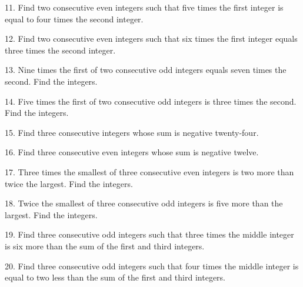 \documentclass{ximera}
\begin{document}
\begin{exercise}
11. Find two consecutive even integers such that five times the first integer is equal to four times the second integer.
\end{exercise}

\begin{exercise}
12. Find two consecutive even integers such that six times the first integer equals three times the second integer.
\end{exercise}

\begin{exercise}
13. Nine times the first of two consecutive odd integers equals seven times the second. Find the integers.
\end{exercise}

\begin{exercise}
14. Five times the first of two consecutive odd integers is three times the second. Find the integers.
\end{exercise}

\begin{exercise}
15. Find three consecutive integers whose sum is negative twenty-four.
\end{exercise}

\begin{exercise}
16. Find three consecutive even integers whose sum is negative twelve.
\end{exercise}

\begin{exercise}
17. Three times the smallest of three consecutive even integers is two more than twice the largest. Find the integers.
\end{exercise}

\begin{exercise}
18. Twice the smallest of three consecutive odd integers is five more than the largest. Find the integers.
\end{exercise}

\begin{exercise}
19. Find three consecutive odd integers such that three times the middle integer is six more than the sum of the first and third integers.
\end{exercise}

\begin{exercise}
20. Find three consecutive odd integers such that four times the middle integer is equal to two less than the sum of the first and third integers.
\end{exercise}
\end{document}
